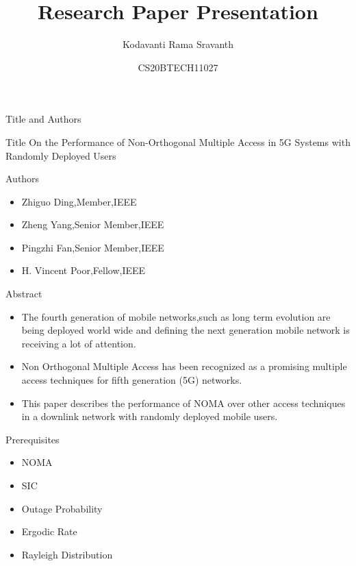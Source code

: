 \documentclass{beamer}
\title{Research Paper Presentation}
\author{Kodavanti Rama Sravanth}
\institute{IITH}
\date{CS20BTECH11027}
\begin{document}
%
\begin{frame}
\titlepage
\end{frame}
\begin{frame}{Title and Authors}
\begin{block}{Title}
On the Performance of Non-Orthogonal
Multiple Access in 5G Systems with
Randomly Deployed Users
\end{block}
\begin{block}{Authors}
\begin{itemize}
    \item Zhiguo Ding,Member,IEEE
    \item Zheng Yang,Senior Member,IEEE
    \item  Pingzhi Fan,Senior Member,IEEE
    \item  H. Vincent Poor,Fellow,IEEE
\end{itemize}
\end{block}
\end{frame}
\begin{frame}{}
\begin{block}{Abstract}
    \begin{itemize}
        \item The fourth generation of mobile networks,such as long term evolution are being deployed world wide and defining the next generation mobile network is receiving a lot of attention.
        \item Non Orthogonal Multiple Access has been recognized as a promising multiple access techniques for  fifth generation (5G)  networks.
        \item This paper describes the performance of NOMA over other access techniques in a downlink network with randomly deployed mobile users.
    \end{itemize}
    \end{block}
    \end{frame}
    \begin{frame}{}
    \begin{block}{Prerequisites}
       \begin{itemize}
           \item NOMA
           \item SIC
           \item Outage Probability
           \item Ergodic Rate
           \item Rayleigh Distribution
       \end{itemize}
    \end{block}
    \end{frame}
\end{document}
